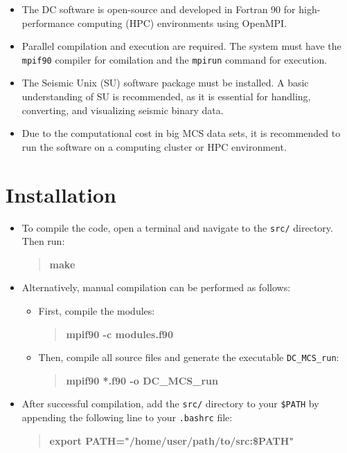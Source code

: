\documentclass[11pt, oneside]{article}   	%
\begin{document}
\begin{itemize}
    \item The DC software is open-source and developed in Fortran 90 for high-performance computing (HPC) environments using OpenMPI.
    
    \item Parallel compilation and execution are required. The system must have the \texttt{mpif90} compiler for comilation and the \texttt{mpirun} command for execution.
    
    \item The Seismic Unix (SU) software package \cite{SU} must be installed. A basic understanding of SU is recommended, as it is essential for handling, converting, and visualizing seismic binary data.
    
    \item Due to the computational cost in big MCS data sets, it is recommended to run the software on a computing cluster or HPC environment.
\end{itemize}


\section{Installation}\label{sec2}

\begin{itemize}
    \item To compile the code, open a terminal and navigate to the \texttt{src/} directory. Then run:
    \begin{quote}
        \textbf{make}
    \end{quote}
    
    \item Alternatively, manual compilation can be performed as follows:
    \begin{itemize}
        \item First, compile the modules:
        \begin{quote}
            \textbf{mpif90 -c modules.f90}
        \end{quote}
        
        \item Then, compile all source files and generate the executable \texttt{DC\_MCS\_run}:
        \begin{quote}
            \textbf{mpif90 *.f90 -o DC\_MCS\_run}
        \end{quote}
    \end{itemize}
    
    \item After successful compilation, add the \texttt{src/} directory to your \texttt{\$PATH} by appending the following line to your \texttt{.bashrc} file:
    \begin{quote}
        \textbf{export PATH="/home/user/path/to/src:\$PATH"}
    \end{quote}
\end{itemize}
\end{document}

